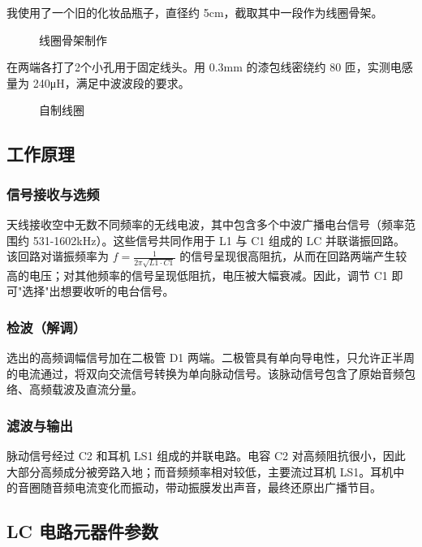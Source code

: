 \documentclass[12pt,UTF8]{ctexbook}
\begin{document}
我使用了一个旧的化妆品瓶子，直径约 5cm，截取其中一段作为线圈骨架。

\begin{figure}[H]
	\centering
	\caption{线圈骨架制作}
	\label{fig:coil-former}
\end{figure}

在两端各打了2个小孔用于固定线头。用 0.3mm 的漆包线密绕约 80 匝，实测电感量为 240μH，满足中波波段的要求。

\begin{figure}[H]
	\centering
	\caption{自制线圈}
	\label{fig:homemade-coil}
\end{figure}

\subsection{工作原理}

\subsubsection{信号接收与选频}

天线接收空中无数不同频率的无线电波，其中包含多个中波广播电台信号（频率范围约 531-1602kHz）。这些信号共同作用于 L1 与 C1 组成的 LC 并联谐振回路。该回路对谐振频率为 $f = \frac{1}{2\pi\sqrt{L1 \cdot C1}}$ 的信号呈现很高阻抗，从而在回路两端产生较高的电压；对其他频率的信号呈现低阻抗，电压被大幅衰减。因此，调节 C1 即可"选择"出想要收听的电台信号。

\subsubsection{检波（解调）}

选出的高频调幅信号加在二极管 D1 两端。二极管具有单向导电性，只允许正半周的电流通过，将双向交流信号转换为单向脉动信号。该脉动信号包含了原始音频包络、高频载波及直流分量。

\subsubsection{滤波与输出}

脉动信号经过 C2 和耳机 LS1 组成的并联电路。电容 C2 对高频阻抗很小，因此大部分高频成分被旁路入地；而音频频率相对较低，主要流过耳机 LS1。耳机中的音圈随音频电流变化而振动，带动振膜发出声音，最终还原出广播节目。

\subsection{LC 电路元器件参数}
\end{document}
